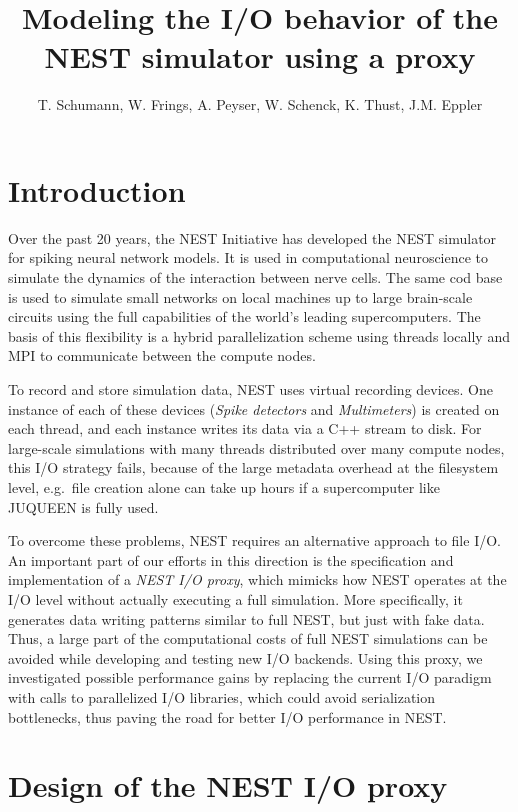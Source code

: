 \documentclass[]{YIC2015}
\title{Modeling the I/O behavior of the NEST simulator using a proxy}
\author[T. Schumann et al.]{%
  T. Schumann\authref{a}\corref,
  W. Frings\authref{b},
  A. Peyser\authref{c},
  W. Schenck\authref{c},
  K. Thust\authref{b},
  J.M. Eppler\authref{c}
}
\begin{document}
\maketitle

\section{Introduction}
%
Over the past 20 years, the NEST Initiative \cite{NESTInitiative} has
developed the NEST simulator \cite{NEST} for spiking neural network
models. It is used in computational neuroscience to simulate the
dynamics of the interaction between nerve cells. The same cod base is
used to simulate small networks on local machines up to large
brain-scale circuits using the full capabilities of the world's
leading supercomputers. The basis of this flexibility is a hybrid
parallelization scheme using threads locally and MPI to communicate
between the compute nodes.

To record and store simulation data, NEST uses virtual recording
devices. One instance of each of these devices (\emph{Spike detectors}
and \emph{Multimeters}) is created on each thread, and each instance
writes its data via a C++ stream to disk. For large-scale simulations
with many threads distributed over many compute nodes, this I/O
strategy fails, because of the large metadata overhead at the
filesystem level, e.g.~file creation alone can take up hours if a
supercomputer like JUQUEEN is fully used.

To overcome these problems, NEST requires an alternative approach to
file I/O. An important part of our efforts in this direction is the
specification and implementation of a \emph{NEST I/O proxy}, which
mimicks how NEST operates at the I/O level without actually executing
a full simulation. More specifically, it generates data writing
patterns similar to full NEST, but just with fake data. Thus, a large
part of the computational costs of full NEST simulations can be
avoided while developing and testing new I/O backends. Using this
proxy, we investigated possible performance gains by replacing the
current I/O paradigm with calls to parallelized I/O libraries, which
could avoid serialization bottlenecks, thus paving the road for better
I/O performance in NEST.

\section{Design of the NEST I/O proxy}
\end{document}

